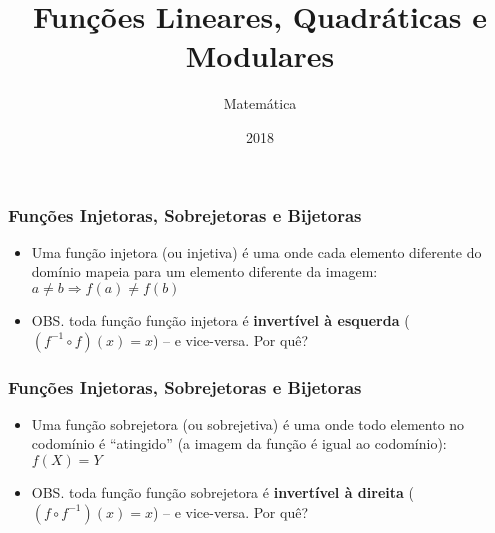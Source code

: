 \documentclass[usenames,dvipsnames,svgnames]{beamer}
\title{Funções Lineares, Quadráticas e Modulares}
\author{Matemática}
\institute{ONGEP}
\date{2018}
\begin{document}
\frame{\titlepage}

\begin{frame}	
	\frametitle{Funções Injetoras, Sobrejetoras e Bijetoras}

	\begin{itemize}
		\item Uma função injetora (ou injetiva) é uma onde cada elemento diferente do domínio mapeia para um elemento diferente da imagem: $a \neq b \Rightarrow f(a) \neq f(b)$
		\item OBS. toda função função injetora é \textbf{invertível à esquerda} ($(f^{-1} \circ f) (x) = x$) -- e vice-versa. Por quê?
	\end{itemize}

	\begin{adjustbox}{max totalsize={\textwidth}{.65\textheight},center}
	\end{adjustbox}

\end{frame}

\begin{frame}	
	\frametitle{Funções Injetoras, Sobrejetoras e Bijetoras}

	\begin{itemize}
		\item Uma função sobrejetora (ou sobrejetiva) é uma onde todo elemento no codomínio é ``atingido'' (a imagem da função é igual ao codomínio): $f(X) = Y$
		\item OBS. toda função função sobrejetora é \textbf{invertível à direita} ($(f \circ f^{-1}) (x) = x$) -- e vice-versa. Por quê?
	\end{itemize}

	\begin{adjustbox}{max totalsize={\textwidth}{.65\textheight},center}
	\end{adjustbox}

\end{frame}
\end{document}
